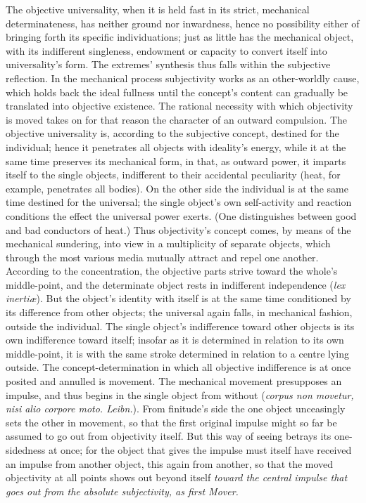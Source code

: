 \documentclass[12pt]{book}
\begin{document}
The objective universality, when it is held fast in its strict, mechanical
determinateness, has neither ground nor inwardness, hence no possibility
either of bringing forth its specific individuations; just as little has the
mechanical object, with its indifferent singleness, endowment or capacity to
convert itself into universality's form. The extremes' synthesis thus falls
within the subjective reflection. In the mechanical process subjectivity
works as an other-worldly cause, which holds back the ideal fullness until
the concept's content can gradually be translated into objective existence.
The rational necessity with which objectivity is moved takes on for that
reason the character of an outward compulsion. The objective universality
is, according to the subjective concept, destined for the individual; hence
it penetrates all objects with ideality's energy, while it at the same time
preserves its mechanical form, in that, as outward power, it imparts itself
to the single objects, indifferent to their accidental peculiarity (heat,
for example, penetrates all bodies). On the other side the individual is at
the same time destined for the universal; the single object's own
self-activity and reaction conditions the effect the universal power exerts.
(One distinguishes between good and bad conductors of heat.) Thus
objectivity's concept comes, by means of the mechanical sundering, into view
in a multiplicity of separate objects, which through the most various media
mutually attract and repel one another. According to the concentration, the
objective parts strive toward the whole's middle-point, and the determinate
object rests in indifferent independence (\textit{lex inertiæ}). But the
object's identity with itself is at the same time conditioned by its
difference from other objects; the universal again falls, in mechanical
fashion, outside the individual. The single object's indifference toward
other objects is its own indifference toward itself; insofar as it is
determined in relation to its own middle-point, it is with the same stroke
determined in relation to a centre lying outside. The
concept-determination in which all objective indifference is at once posited
and annulled is movement. The mechanical movement presupposes an impulse,
and thus begins in the single object from without (\textit{corpus non
movetur, nisi alio corpore moto. Leibn.}). From finitude's side the one
object unceasingly sets the other in movement, so that the first original
impulse might so far be assumed to go out from objectivity itself. But this
way of seeing betrays its one-sidedness at once; for the object that gives
the impulse must itself have received an impulse from another object, this
again from another, so that the moved objectivity at all points shows out
beyond itself \emph{toward the central impulse that goes out from the
absolute subjectivity, as first Mover.}
\end{document}
